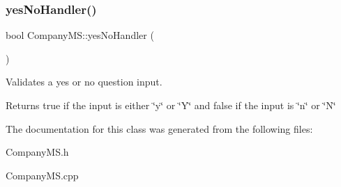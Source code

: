 \subsubsection{\texorpdfstring{yes\+No\+Handler()}{yesNoHandler()}}
{\footnotesize\ttfamily bool Company\+M\+S\+::yes\+No\+Handler (\begin{DoxyParamCaption}{ }\end{DoxyParamCaption})}



Validates a yes or no question input. 

\begin{DoxyReturn}{Returns}
true if the input is either \char`\"{}y\char`\"{} or \char`\"{}\+Y\char`\"{} and false if the input is \char`\"{}n\char`\"{} or \char`\"{}\+N\char`\"{} 
\end{DoxyReturn}


The documentation for this class was generated from the following files\+:\begin{DoxyCompactItemize}
\item 
Company\+M\+S.\+h\item 
Company\+M\+S.\+cpp\end{DoxyCompactItemize}

